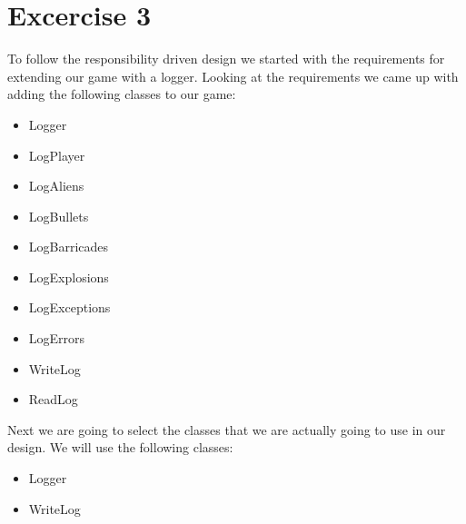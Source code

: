 \documentclass[10pt]{article}
\begin{document}
\section*{Excercise 3}

To follow the responsibility driven design we started with the requirements for extending our game with a logger.
Looking at the requirements we came up with adding the following classes to our game:
\begin{itemize}
\item Logger
\item LogPlayer
\item LogAliens
\item LogBullets
\item LogBarricades
\item LogExplosions
\item LogExceptions
\item LogErrors
\item WriteLog
\item ReadLog
\end{itemize}

Next we are going to select the classes that we are actually going to use in our design. We will use the following classes:
\begin{itemize}
\item Logger
\item WriteLog
\end{itemize}
\end{document}
